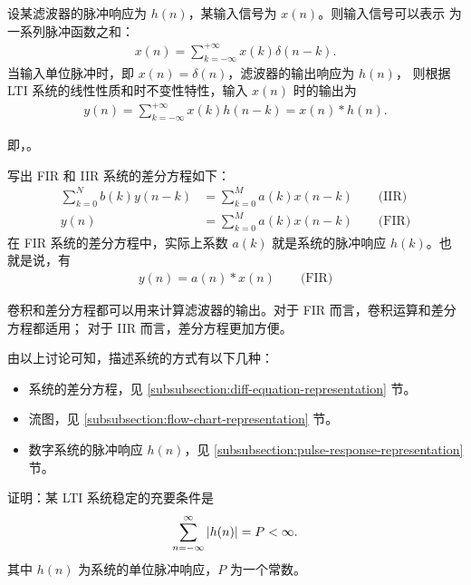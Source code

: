 \begin{theorem}
    设某滤波器的脉冲响应为 $h(n)$，某输入信号为 $x(n)$。则输入信号可以表示
    为一系列脉冲函数之和：
    \begin{align*}
        x(n) = \sum_{k = -\infty}^{+\infty}x(k)\delta(n - k).
    \end{align*}
    当输入单位脉冲时，即 $x(n) = \delta(n)$，滤波器的输出响应为 $h(n)$，
    则根据 LTI 系统的线性性质和时不变性特性，输入 $x(n)$ 时的输出为
    \begin{align*}
        y(n) = \sum_{k = -\infty}^{+\infty}x(k)h(n - k) = x(n) * h(n).
    \end{align*}
    
    即，。
\end{theorem}

\begin{property}[差分方程与卷积运算]
    \label{property:diff-equation-convolution}
    写出 FIR 和 IIR 系统的差分方程如下：
    \begin{align*}
        \sum_{k = 0}^{N}b(k)y(n - k) & = \sum_{k = 0}^{M}a(k)x(n - k) \qquad \text{(IIR)} \\
        y(n) & = \sum_{k = 0}^{M}a(k)x(n - k) \qquad \text{(FIR)}
    \end{align*}
    在 FIR 系统的差分方程中，实际上系数 $a(k)$ 就是系统的脉冲响应 $h(k)$。也就是说，有
    \begin{align*}
        y(n) = a(n) * x(n) \qquad \text{(FIR)}
    \end{align*}

    卷积和差分方程都可以用来计算滤波器的输出。对于 FIR 而言，卷积运算和差分方程都适用；
    对于 IIR 而言，差分方程更加方便。
\end{property}

\begin{remark}
    由以上讨论可知，描述系统的方式有以下几种：
    \begin{itemize}
        \item 系统的差分方程，见 \ref{subsubsection:diff-equation-representation} 节。
        \item 流图，见 \ref{subsubsection:flow-chart-representation} 节。
        \item 数字系统的脉冲响应 $h(n)$，见 \ref{subsubsection:pulse-response-representation} 节。
    \end{itemize}
\end{remark}

\begin{exercise}
    \label{exercise:LTI-stable}
    证明：某 LTI 系统稳定的充要条件是
    \begin{align*}
        \sum_{n = -\infty}^{\infty} \left|h(n)\right| = P < \infty.
    \end{align*}
    其中 $h(n)$ 为系统的单位脉冲响应，$P$ 为一个常数。
\end{exercise}

